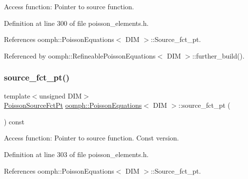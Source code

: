 Access function\+: Pointer to source function. 



Definition at line 300 of file poisson\+\_\+elements.\+h.



References oomph\+::\+Poisson\+Equations$<$ D\+I\+M $>$\+::\+Source\+\_\+fct\+\_\+pt.



Referenced by oomph\+::\+Refineable\+Poisson\+Equations$<$ D\+I\+M $>$\+::further\+\_\+build().

\mbox{\label{classoomph_1_1PoissonEquations_a3b726ee15516f4cf86d2aea3e153c20b}} 
\subsubsection{\texorpdfstring{source\+\_\+fct\+\_\+pt()}{source\_fct\_pt()}\hspace{0.1cm}{\footnotesize\ttfamily [2/2]}}
{\footnotesize\ttfamily template$<$unsigned D\+IM$>$ \\
\hyperlink{classoomph_1_1PoissonEquations_a1e3a857c1f506c99d437fb932a24c828}{Poisson\+Source\+Fct\+Pt} \hyperlink{classoomph_1_1PoissonEquations}{oomph\+::\+Poisson\+Equations}$<$ D\+IM $>$\+::source\+\_\+fct\+\_\+pt (\begin{DoxyParamCaption}{ }\end{DoxyParamCaption}) const\hspace{0.3cm}{\ttfamily [inline]}}



Access function\+: Pointer to source function. Const version. 



Definition at line 303 of file poisson\+\_\+elements.\+h.



References oomph\+::\+Poisson\+Equations$<$ D\+I\+M $>$\+::\+Source\+\_\+fct\+\_\+pt.

\mbox{\label{classoomph_1_1PoissonEquations_ae2e4e133bde4c4cbddf00de6c4feb72c}} 
